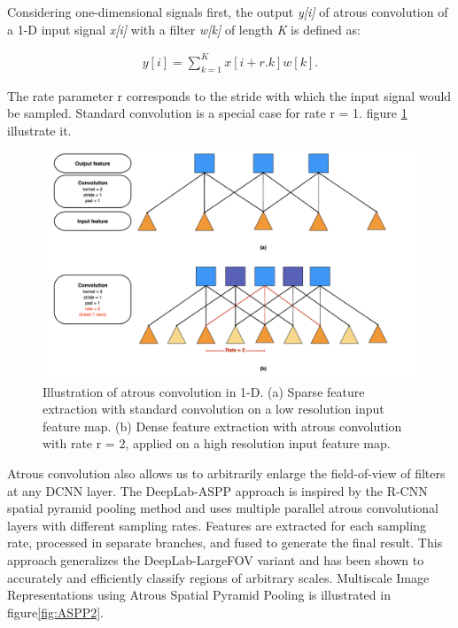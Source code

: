 \documentclass[english, LaM, oneside]{sapthesis}%
\begin{document}
Considering one-dimensional signals first, the output \textit{y[i]} of atrous convolution of a 1-D input signal \textit{x[i]} with a filter \textit{w[k]} of length \textit{K} is defined as:

\begin{equation}\label{eq:41}
\begin{flalign*}
         y[i] = \sum_{k=1}^{K} x[i+r.k]w[k].
    \end{flalign*}
\end{equation}

The rate parameter r corresponds to the stride with which the input signal would be sampled. Standard convolution is a special case for rate r = 1. figure \ref{fig:ASPP1} illustrate it. 

\begin{figure}[h] %
    \centering
    \includegraphics[scale=0.3]{Images/ASPP1.png}
    \caption{Illustration of atrous convolution in 1-D. (a) Sparse feature extraction with standard convolution on a low resolution input feature map. (b) Dense feature extraction with atrous convolution with rate r = 2, applied on a high resolution input feature map.}
    \label{fig:ASPP1}
\end{figure}



Atrous convolution also allows us to arbitrarily enlarge the field-of-view of filters at any DCNN layer. The DeepLab-ASPP approach is inspired by the R-CNN spatial pyramid pooling method and uses multiple parallel atrous convolutional layers with different sampling rates. Features are extracted for each sampling rate, processed in separate branches, and fused to generate the final result. This approach generalizes the DeepLab-LargeFOV variant and has been shown to accurately and efficiently classify regions of arbitrary scales. Multiscale Image Representations using Atrous Spatial Pyramid Pooling is illustrated in figure\ref{fig:ASPP2}.
\end{document}
